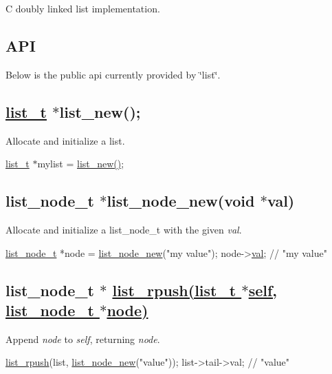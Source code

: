 C doubly linked list implementation.

\subsection*{A\+PI}

Below is the public api currently provided by \char`\"{}list\char`\"{}.

\subsection*{\hyperlink{structlist__t}{list\+\_\+t} $\ast$list\+\_\+new();}

Allocate and initialize a {\ttfamily list}.

\hyperlink{structlist__t}{list\+\_\+t} $\ast$mylist = \hyperlink{list_8c_a9dd3eafdb56dcc64689f78fb4acdff3f}{list\+\_\+new()};

\subsection*{list\+\_\+node\+\_\+t $\ast$list\+\_\+node\+\_\+new(void $\ast$val)}

Allocate and initialize a {\ttfamily list\+\_\+node\+\_\+t} with the given {\itshape val}.


\begin{DoxyCode}
\hyperlink{structlist__node}{list\_node\_t} *node = \hyperlink{list_8h_a4ef36e0519514ac481d0d7e0b439d431}{list\_node\_new}(\textcolor{stringliteral}{"my value"});
node->\hyperlink{structlist__node_a129de89b4c110fa54377ef16ab128ce0}{val}; \textcolor{comment}{// "my value"}
\end{DoxyCode}


\subsection*{list\+\_\+node\+\_\+t $\ast$ \hyperlink{list_8h_a4edfa9b7742154bff4fc2cb05d044af9}{list\+\_\+rpush(list\+\_\+t $\ast$self, list\+\_\+node\+\_\+t $\ast$node)}}

Append {\itshape node} to {\itshape self}, returning {\itshape node}.


\begin{DoxyCode}
\hyperlink{list_8c_a4edfa9b7742154bff4fc2cb05d044af9}{list\_rpush}(list, \hyperlink{list_8h_a4ef36e0519514ac481d0d7e0b439d431}{list\_node\_new}(\textcolor{stringliteral}{"value"}));
list->tail->val; \textcolor{comment}{// "value"}
\end{DoxyCode}


